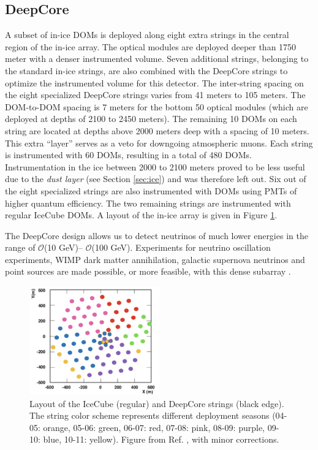 \subsection{DeepCore}
\label{subsec:DC}
A subset of in-ice DOMs is deployed along eight extra strings in the central region of the in-ice array. The optical modules are deployed deeper than 1750 meter with a denser instrumented volume. Seven additional strings, belonging to the standard in-ice strings, are also combined with the DeepCore strings to optimize the instrumented volume for this detector. The inter-string spacing on the eight specialized DeepCore strings varies from 41 meters to 105 meters. The DOM-to-DOM spacing is 7 meters for the bottom 50 optical modules (which are deployed at depths of 2100 to 2450 meters). The remaining 10 DOMs on each string are located at depths above 2000 meters deep with a spacing of 10 meters. This extra ``layer'' serves as a veto for downgoing atmospheric muons. Each string is instrumented with 60 DOMs, resulting in a total of 480 DOMs. Instrumentation in the ice between 2000 to 2100 meters proved to be less useful due to the \textit{dust layer} (see Section \ref{sec:ice}) and was therefore left out. Six out of the eight specialized strings are also instrumented with DOMs using PMTs of higher quantum efficiency. The two remaining strings are instrumented with regular IceCube DOMs. A layout of the in-ice array is given in Figure \ref{fig:layoutIC}.

The DeepCore design allows us to detect neutrinos of much lower energies in the range of $\mathcal{O}$(10 GeV)– $\mathcal{O}$(100 GeV). Experiments for neutrino oscillation experiments, WIMP dark matter annihilation, galactic supernova neutrinos and point sources are made possible, or more feasible, with this dense subarray \cite{Collaboration:2011ym}.

\begin{figure}[t]
\centering
\includegraphics[width=0.5\textwidth]{chapter5/img/layoutIC.png}
\caption{Layout of the IceCube (regular) and DeepCore strings (black edge). The string color scheme represents different deployment seasons (04-05: orange, 05-06: green, 06-07: red, 07-08: pink, 08-09: purple, 09-10: blue, 10-11: yellow). Figure from Ref. \cite{Choma:2018zbe}, with minor corrections.}
\label{fig:layoutIC}
\end{figure}

